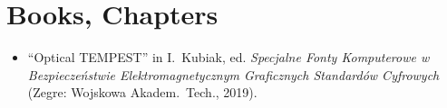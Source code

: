 \section*{Books, Chapters}
\vspace{-3mm}

\begin{itemize}
  \item ``Optical TEMPEST'' in I.\ Kubiak, ed. \emph{Specjalne Fonty
    Komputerowe w Bezpiecze\'{n}stwie Elektromagnetycznym Graficznych
    Standard\'{o}w Cyfrowych} (Zegre: Wojskowa Akadem.\ Tech., 2019).
\end{itemize}

